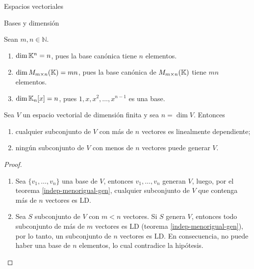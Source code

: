 \begin{chapter}{Espacios vectoriales}
\begin{section}{Bases y dimensi\'on}
\begin{ejemplo*} Sean $m,n \in \mathbb N$. 
    \begin{enumerate}
        \item $\dim \mathbb K^n= n$, pues  la base canónica tiene $n$ elementos.
        \item $\dim M_{m \times n}(\mathbb K) = mn$, pues la base canónica de $M_{m \times n}(\mathbb K)$ tiene $mn$  elementos.  
        \item $\dim \mathbb K_n[x] =n$, pues $1,x,x^2,\ldots,x^{n-1}$ es una base.   
    \end{enumerate}
\end{ejemplo*}
        
        
        \begin{corolario}
            Sea $V$ un espacio vectorial de dimensión finita y sea $n = \dim V$. 
            Entonces
            \begin{enumerate}
                \item cualquier subconjunto de $V$ con más de $n$ vectores es linealmente
                dependiente;
                \item ningún subconjunto de $V$ con menos de $n$ vectores puede generar $V$.
            \end{enumerate} 
        \end{corolario}
    \begin{proof}
        \begin{enumerate}
            \item Sea $\{v_1,\ldots,v_n\}$ una base de $V$, entonces $v_1,\ldots,v_n$ generan $V$, luego, por el teorema \ref{indep-menorigual-gen}, cualquier subconjunto de $V$ que contenga más de $n$ vectores es LD.
            \item Sea $S$  subconjunto de $V$ con $m < n$ vectores. Si $S$  genera $V$,  entonces todo subconjunto de más de $m$  vectores es LD (teorema \ref{indep-menorigual-gen}), por lo tanto, un subconjunto de $n$ vectores es LD. En  consecuencia, no puede haber una base de $n$  elementos, lo cual contradice la hipótesis.
        \end{enumerate} 
    \end{proof}


\end{section}
\end{chapter}
